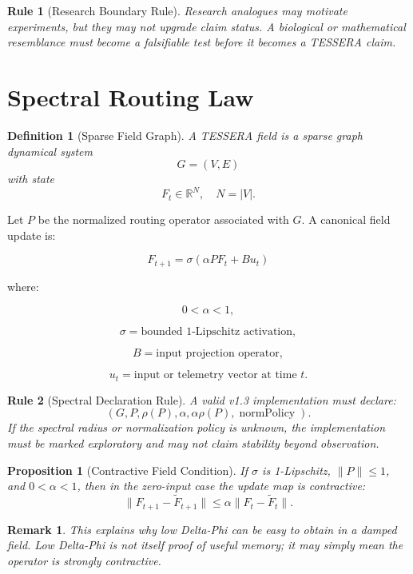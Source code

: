 \documentclass[12pt]{article}
\newtheorem{definition}{Definition}
\newtheorem{rulebox}{Rule}
\newtheorem{proposition}{Proposition}
\newtheorem{remark}{Remark}
\begin{document}
\begin{rulebox}[Research Boundary Rule]
Research analogues may motivate experiments, but they may not upgrade claim
status. A biological or mathematical resemblance must become a falsifiable test
before it becomes a TESSERA claim.
\end{rulebox}

\section{Spectral Routing Law}

\begin{definition}[Sparse Field Graph]
A TESSERA field is a sparse graph dynamical system
\[
G=(V,E)
\]
with state
\[
F_t\in\mathbb{R}^{N},\quad N=|V|.
\]
\end{definition}

Let \(P\) be the normalized routing operator associated with \(G\). A canonical
field update is:

\[
\boxed{
F_{t+1}=\sigma(\alpha P F_t + B u_t)
}
\]

where:

\[
0<\alpha<1,
\]

\[
\sigma=\text{bounded 1-Lipschitz activation},
\]

\[
B=\text{input projection operator},
\]

\[
u_t=\text{input or telemetry vector at time }t.
\]

\begin{rulebox}[Spectral Declaration Rule]
A valid v1.3 implementation must declare:
\[
(G,P,\rho(P),\alpha,\alpha\rho(P),\operatorname{normPolicy}).
\]
If the spectral radius or normalization policy is unknown, the implementation
must be marked exploratory and may not claim stability beyond observation.
\end{rulebox}

\begin{proposition}[Contractive Field Condition]
If \(\sigma\) is 1-Lipschitz, \(\|P\|\leq1\), and \(0<\alpha<1\), then in the
zero-input case the update map is contractive:
\[
\|F_{t+1}-\tilde{F}_{t+1}\|
\leq
\alpha\|F_t-\tilde{F}_t\|.
\]
\end{proposition}

\begin{remark}
This explains why low Delta-Phi can be easy to obtain in a damped field. Low
Delta-Phi is not itself proof of useful memory; it may simply mean the operator
is strongly contractive.
\end{remark}
\end{document}

